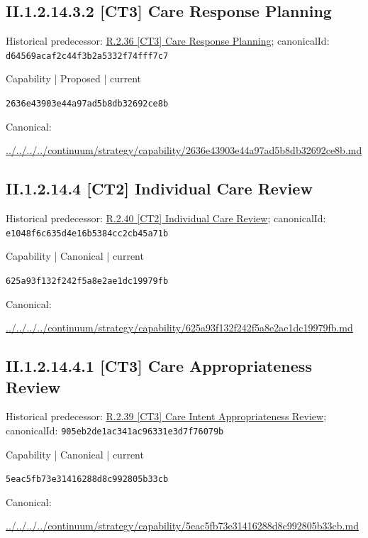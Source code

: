 \documentclass[10pt,a4paper]{article}
\begin{document}
\subsection*{II.1.2.14.3.2 [CT3] Care Response Planning}
Historical predecessor: \hyperref[element-d64569acaf2c44f3b2a5332f74fff7c7]{R.2.36 [CT3] Care Response Planning}; canonicalId: \texttt{d64569acaf2c44f3b2a5332f74fff7c7}\par
\label{element-2636e43903e44a97ad5b8db32692ce8b}
{\small Capability | Proposed | current}\par
\texttt{2636e43903e44a97ad5b8db32692ce8b}\par
Canonical: \par
{\footnotesize\url{../../../../continuum/strategy/capability/2636e43903e44a97ad5b8db32692ce8b.md}}\par
\subsection*{II.1.2.14.4 [CT2] Individual Care Review}
Historical predecessor: \hyperref[element-e1048f6c635d4e16b5384cc2cb45a71b]{R.2.40 [CT2] Individual Care Review}; canonicalId: \texttt{e1048f6c635d4e16b5384cc2cb45a71b}\par
\label{element-625a93f132f242f5a8e2ae1dc19979fb}
{\small Capability | Canonical | current}\par
\texttt{625a93f132f242f5a8e2ae1dc19979fb}\par
Canonical: \par
{\footnotesize\url{../../../../continuum/strategy/capability/625a93f132f242f5a8e2ae1dc19979fb.md}}\par
\subsection*{II.1.2.14.4.1 [CT3] Care Appropriateness Review}
Historical predecessor: \hyperref[element-905eb2de1ac341ac96331e3d7f76079b]{R.2.39 [CT3] Care Intent Appropriateness Review}; canonicalId: \texttt{905eb2de1ac341ac96331e3d7f76079b}\par
\label{element-5eac5fb73e31416288d8c992805b33cb}
{\small Capability | Canonical | current}\par
\texttt{5eac5fb73e31416288d8c992805b33cb}\par
Canonical: \par
{\footnotesize\url{../../../../continuum/strategy/capability/5eac5fb73e31416288d8c992805b33cb.md}}\par
\end{document}
